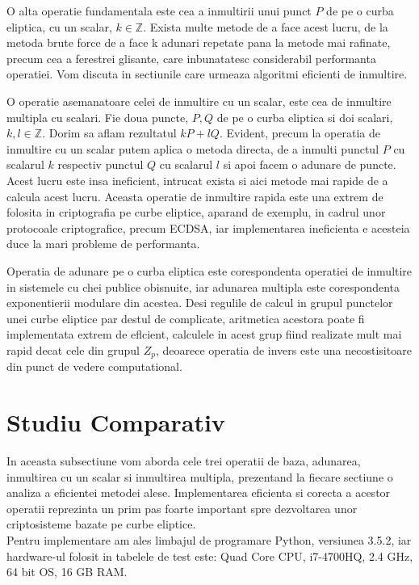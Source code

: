 \begin{dfn}
O alta operatie fundamentala este cea a inmultirii unui punct $P$ de pe o curba eliptica, cu un scalar, $k\in \mathbb{Z}$. Exista multe metode de a face acest lucru, de la metoda brute force de a face k adunari repetate pana la metode mai rafinate, precum cea a ferestrei glisante, care inbunatatesc considerabil performanta operatiei. Vom discuta in sectiunile care urmeaza algoritmi eficienti de inmultire. 
\end{dfn}

\begin{dfn}
O operatie asemanatoare celei de inmultire cu un scalar, este cea de inmultire multipla cu scalari. Fie doua puncte, $P, Q$ de pe o curba eliptica si doi scalari, $k, l\in \mathbb{Z}$. Dorim sa aflam rezultatul $kP + lQ$. Evident, precum la operatia de inmultire cu un scalar putem aplica o metoda directa, de a inmulti punctul $P$ cu scalarul $k$ respectiv punctul $Q$ cu scalarul $l$ si apoi facem o adunare de puncte. Acest lucru este insa ineficient, intrucat exista si aici metode mai rapide de a calcula acest lucru. Aceasta operatie de inmultire rapida este una extrem de folosita in criptografia pe curbe eliptice, aparand de exemplu, in cadrul unor protocoale criptografice, precum ECDSA, iar implementarea ineficienta e acesteia duce la mari probleme de performanta. 
\end{dfn}

\begin{obs}
Operatia de adunare pe o curba eliptica este corespondenta operatiei de inmultire
in sistemele cu chei publice obisnuite, iar adunarea multipla este corespondenta
exponentierii modulare din acestea.
Desi regulile de calcul in grupul punctelor unei curbe eliptice par destul de complicate, aritmetica acestora poate fi implementata extrem de eflcient, calculele in acest grup fiind realizate mult mai rapid decat cele din grupul $Z_p$, deoarece operatia de invers este una necostisitoare din punct de vedere computational.
\end{obs}

\section{Studiu Comparativ}
\label{sec:sec03}
In aceasta subsectiune vom aborda cele trei operatii de baza, adunarea, inmultirea cu un scalar si inmultirea multipla, prezentand la fiecare sectiune o analiza a eficientei metodei alese. Implementarea eficienta si corecta a acestor operatii reprezinta un prim pas foarte important spre dezvoltarea unor criptosisteme bazate pe curbe eliptice.
\\ Pentru implementare am ales limbajul de programare Python, versiunea 3.5.2, iar hardware-ul folosit in tabelele de test este: Quad Core CPU, i7-4700HQ, 2.4 GHz, 64 bit OS, 16 GB RAM.

